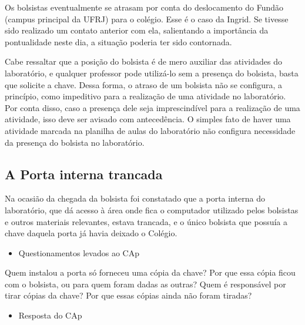 Os bolsistas eventualmente se atrasam por conta do deslocamento do Fundão (campus principal da UFRJ) para o colégio. Esse é o caso da Ingrid. Se tivesse sido realizado um contato anterior com ela, salientando a importância da pontualidade neste dia, a situação poderia ter sido contornada.

Cabe ressaltar que a posição do bolsista é de mero auxiliar das atividades do laboratório, e qualquer professor pode utilizá-lo sem a presença do bolsista, basta que solicite a chave. Dessa forma, o atraso de um bolsista não se configura, a princípio, como impeditivo para a realização de uma atividade no laboratório. Por conta disso, caso a presença dele seja imprescindível para a realização de uma atividade, isso deve ser avisado com antecedência. O simples fato de haver uma atividade marcada na planilha de aulas do laboratório não configura necessidade da presença do bolsista no laboratório.

\subsection{A Porta interna trancada}\label{sec:LABEL_CHP_REL_SEC_PROBS_SUBSEC_POR}

Na ocasião da chegada da bolsista foi constatado que a porta interna do laboratório, que dá acesso à área onde fica o computador utilizado pelos bolsistas e outros materiais relevantes, estava trancada, e o único bolsista que possuía a chave daquela porta já havia deixado o Colégio.

\begin{itemize}
    \item Questionamentos levados ao CAp
\end{itemize}

Quem instalou a porta só forneceu uma cópia da chave? Por que essa cópia ficou com o bolsista, ou para quem foram dadas as outras? Quem é responsável por tirar cópias da chave? Por que essas cópias ainda não foram tiradas?

\begin{itemize}
    \item Resposta do CAp
\end{itemize}

